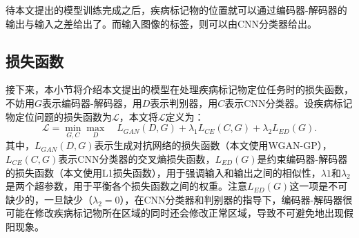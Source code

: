 待本文提出的模型训练完成之后，疾病标记物的位置就可以通过编码器-解码器的输出与输入之差给出了。而输入图像的标签，则可以由CNN分类器给出。
\subsection{损失函数}\label{subsec:loss_func}
接下来，本小节将介绍本文提出的模型在处理疾病标记物定位任务时的损失函数，不妨用$G$表示编码器-解码器，用$D$表示判别器，用$C$表示CNN分类器。设疾病标记物定位问题的损失函数为$\mathcal{L}$，本文将$\mathcal{L}$定义为：
\begin{equation}\label{equ:model_loss_func}
\mathcal{L}=\min _{G, C} \max _{D} \quad L_{GAN}(D, G)+\lambda_{1} L_{C E}(C, G)+\lambda_{2} L_{E D}(G).
\end{equation}
其中，$L_{GAN}(D,G)$表示生成对抗网络的损失函数（本文使用WGAN-GP），$L_{CE}(C, G)$表示CNN分类器的交叉熵损失函数，$L_{E D}(G)$是约束编码器-解码器的损失函数（本文使用L1损失函数），用于强调输入和输出之间的相似性，$\lambda{1}$和$\lambda_{2}$是两个超参数，用于平衡各个损失函数之间的权重。注意$L_{E D}(G)$这一项是不可缺少的，一旦缺少（$\lambda_{2}=0$），在CNN分类器和判别器的指导下，编码器-解码器很可能在修改疾病标记物所在区域的同时还会修改正常区域，导致不可避免地出现假阳现象。

